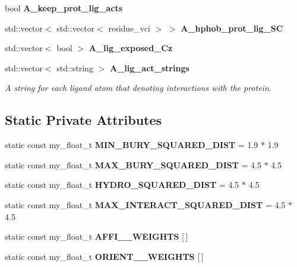 \begin{CompactItemize}
\item 
bool \textbf{A\_\-keep\_\-prot\_\-lig\_\-acts}\label{classSimSite3D_1_1ProtLigScore_bbc85c49bf05b6d54a1f786596f47b1f}

\item 
std::vector$<$ std::vector$<$ residue\_\-vci $>$ $>$ \textbf{A\_\-hphob\_\-prot\_\-lig\_\-SC}\label{classSimSite3D_1_1ProtLigScore_f737fa004d7fa88be1f6f9c6d155b099}

\item 
std::vector$<$ bool $>$ \textbf{A\_\-lig\_\-exposed\_\-Cz}\label{classSimSite3D_1_1ProtLigScore_c449cc6743b06bef1df97a236a693305}

\item 
std::vector$<$ std::string $>$ \bf{A\_\-lig\_\-act\_\-strings}\label{classSimSite3D_1_1ProtLigScore_615545947d1470e69c9aa7b0169b4b28}

\begin{CompactList}\small\item\em A string for each ligand atom that denoting interactions with the protein. \item\end{CompactList}\end{CompactItemize}
\subsection*{Static Private Attributes}
\begin{CompactItemize}
\item 
static const my\_\-float\_\-t \textbf{MIN\_\-BURY\_\-SQUARED\_\-DIST} = 1.9 $\ast$ 1.9\label{classSimSite3D_1_1ProtLigScore_f5458d92783fb455d0a7b474734862ac}

\item 
static const my\_\-float\_\-t \textbf{MAX\_\-BURY\_\-SQUARED\_\-DIST} = 4.5 $\ast$ 4.5\label{classSimSite3D_1_1ProtLigScore_8351bdb8162c375a142cc69d4125661a}

\item 
static const my\_\-float\_\-t \textbf{HYDRO\_\-SQUARED\_\-DIST} = 4.5 $\ast$ 4.5\label{classSimSite3D_1_1ProtLigScore_9629a637153e69bc93198e76bd054ff8}

\item 
static const my\_\-float\_\-t \textbf{MAX\_\-INTERACT\_\-SQUARED\_\-DIST} = 4.5 $\ast$ 4.5\label{classSimSite3D_1_1ProtLigScore_38fd929f2c9ae78cc55b55383e910fa4}

\item 
static const my\_\-float\_\-t \textbf{AFFI\_\_\-WEIGHTS} [$\,$]
\item 
static const my\_\-float\_\-t \textbf{ORIENT\_\_\-WEIGHTS} [$\,$]
\end{CompactItemize}
